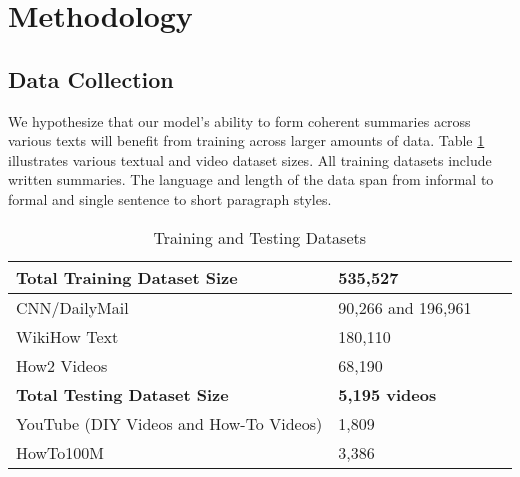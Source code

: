 \documentclass[sigconf]{acmart}
\begin{document}
\section{Methodology}

\subsection{Data Collection}
We hypothesize that our model's ability to form coherent summaries across various texts will benefit from training across larger amounts of data. Table \ref{tab:datasets} illustrates various textual and video dataset sizes. All training datasets include written summaries. The language and length of the data span from informal to formal and single sentence to short paragraph styles.


\begin{table}
  \caption{Training and Testing Datasets}
  \label{tab:datasets}
  \centering
  \begin{tabular}{llll}
    \toprule
        \textbf{Total Training Dataset Size} & \textbf{535,527} \\
    \midrule
    CNN/DailyMail & 90,266 and 196,961 \\
    \midrule
    WikiHow Text & 180,110 \\
    \midrule
    How2 Videos & 68,190 \\
    \midrule
  \textbf{Total Testing Dataset Size}  &  \textbf{5,195 videos} \\
    \midrule
    YouTube (DIY Videos and How-To Videos)& 1,809 \\
    \midrule
    HowTo100M & 3,386   \\
   \bottomrule
  \end{tabular}
  \end{table} 
  
  
\end{document}
